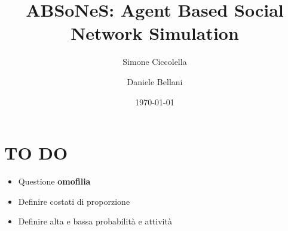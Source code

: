 \documentclass[12pt,italian]{article}
\title{ABSoNeS: Agent Based Social Network Simulation}
\author[1]{Simone Ciccolella}
\author[2]{Daniele Bellani}
\affil[1]{email}
\affil[2]{email}
\date{\today}
\begin{document}
\maketitle

\section*{TO DO}
\begin{itemize}
\item Questione \textbf{omofilia}
\item Definire costati di proporzione
\item Definire alta e bassa probabilit\`a e attivit\`a
\end{itemize}






\end{document}
